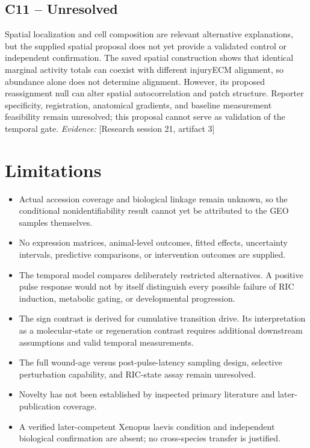\documentclass[11pt]{article}
\begin{document}
\subsection{C11 -- Unresolved}
Spatial localization and cell composition are relevant alternative explanations, but the supplied spatial proposal does not yet provide a validated control or independent confirmation.
The saved spatial construction shows that identical marginal activity totals can coexist with different injury\textendash{}ECM alignment, so abundance alone does not determine alignment. However, its proposed reassignment null can alter spatial autocorrelation and patch structure. Reporter specificity, registration, anatomical gradients, and baseline measurement feasibility remain unresolved; this proposal cannot serve as validation of the temporal gate.
\textit{Evidence: }[Research session 21, artifact 3]
\section{Limitations}
\begin{itemize}
\item Actual accession coverage and biological linkage remain unknown, so the conditional nonidentifiability result cannot yet be attributed to the GEO samples themselves.
\item No expression matrices, animal-level outcomes, fitted effects, uncertainty intervals, predictive comparisons, or intervention outcomes are supplied.
\item The temporal model compares deliberately restricted alternatives. A positive pulse response would not by itself distinguish every possible failure of RIC induction, metabolic gating, or developmental progression.
\item The sign contrast is derived for cumulative transition drive. Its interpretation as a molecular-state or regeneration contrast requires additional downstream assumptions and valid temporal measurements.
\item The full wound-age versus post-pulse-latency sampling design, selective perturbation capability, and RIC-state assay remain unresolved.
\item Novelty has not been established by inspected primary literature and later-publication coverage.
\item A verified later-competent Xenopus laevis condition and independent biological confirmation are absent; no cross-species transfer is justified.
\end{itemize}
\end{document}
